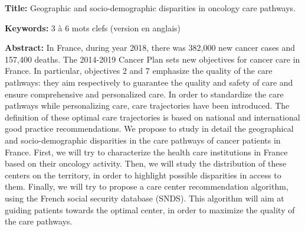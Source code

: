 \begin{mdframed}[linecolor=Prune,linewidth=1]

\textbf{Title:} Geographic and socio-demographic disparities in oncology care pathways.

\noindent \textbf{Keywords:} 3 à 6 mots clefs (version en anglais)

\vspace{-.5cm}
\begin{multicols}{2}
\noindent \textbf{Abstract:} In France, during year 2018, there was 382,000 new cancer cases and 157,400 deaths. The 2014-2019 Cancer Plan sets new objectives for cancer care in France. In particular, objectives 2 and 7 emphasize the quality of the care pathways: they aim respectively to guarantee the quality and safety of care and ensure comprehensive and personalized care. In order to standardize the care pathways while personalizing care, care trajectories have been introduced. The definition of these optimal care trajectories is based on national and international good practice recommendations. We propose to study in detail the geographical and socio-demographic disparities in the care pathways of cancer patients in France. First, we will try to characterize the health care institutions in France based on their oncology activity. Then, we will study the distribution of these centers on the territory, in order to highlight possible disparities in access to them. Finally, we will try to propose a care center recommendation algorithm, using the French social security database (SNDS). This algorithm will aim at guiding patients towards the optimal center, in order to maximize the quality of the care pathways.

\end{multicols}
\end{mdframed}